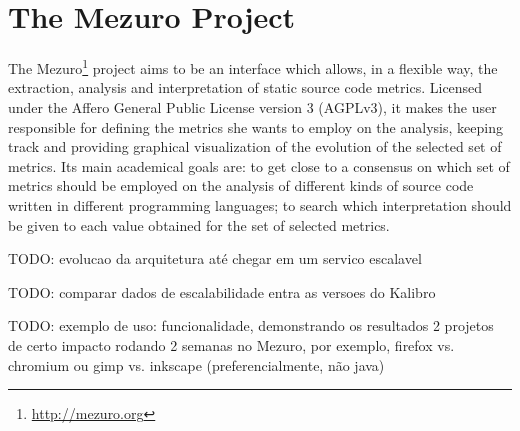 \newpage
\section{The Mezuro Project}
\label{sec:mezuro}


The Mezuro\footnote{\url{http://mezuro.org}} project aims to be an interface which allows, in a flexible way, the extraction, analysis and interpretation of static source code metrics. Licensed under the Affero General Public License version 3 (AGPLv3), it makes the user responsible for defining the metrics she wants to employ on the analysis, keeping track and providing graphical visualization of the evolution of the selected set of metrics. Its main academical goals are: to get close to a consensus on which set of metrics should be employed on the analysis of different kinds of source code written in different programming languages; to search which interpretation should be given to each value obtained for the set of selected metrics.

TODO: evolucao da arquitetura até chegar em um servico escalavel

TODO: comparar dados de escalabilidade entra as versoes do Kalibro

TODO: exemplo de uso: funcionalidade, demonstrando os resultados 2 projetos de
certo impacto rodando 2 semanas no Mezuro, por exemplo, firefox vs.  chromium
ou gimp vs. inkscape (preferencialmente, não java)
